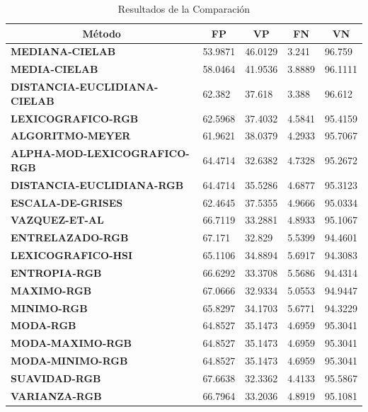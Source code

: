 \begin{table}[]
\centering
\caption{Resultados de la Comparación}
\label{resultados}
\resizebox{15cm}{!} {
\begin{tabular}{|l|l|l|l|l|}
\hline
\multicolumn{1}{|c|}{\textbf{Método}} & \multicolumn{1}{c|}{\textbf{FP}} & \multicolumn{1}{c|}{\textbf{VP}} & \multicolumn{1}{c|}{\textbf{FN}}	&	\multicolumn{1}{c|}{\textbf{VN}} \\ \hline
\textbf{MEDIANA-CIELAB} & 53.9871 & 46.0129 & 3.241 & 96.759\\ \hline
\textbf{MEDIA-CIELAB} & 58.0464 & 41.9536 & 3.8889 & 96.1111\\ \hline
\textbf{DISTANCIA-EUCLIDIANA-CIELAB} & 62.382 & 37.618 & 3.388 & 96.612\\ \hline
\textbf{LEXICOGRAFICO-RGB} & 62.5968 & 37.4032 & 4.5841 & 95.4159\\ \hline
\textbf{ALGORITMO-MEYER} & 61.9621 & 38.0379 & 4.2933 & 95.7067 \\ \hline
\textbf{ALPHA-MOD-LEXICOGRAFICO-RGB} & 64.4714 & 32.6382 & 4.7328 & 95.2672\\ \hline
\textbf{DISTANCIA-EUCLIDIANA-RGB} & 64.4714 & 35.5286 & 4.6877 & 95.3123 \\ \hline
\textbf{ESCALA-DE-GRISES} & 62.4645 & 37.5355 & 4.9666 & 95.0334 \\ \hline
\textbf{VAZQUEZ-ET-AL} & 66.7119 & 33.2881 & 4.8933 & 95.1067\\ \hline
\textbf{ENTRELAZADO-RGB} & 67.171 & 32.829 & 5.5399 & 94.4601 \\ \hline
\textbf{LEXICOGRAFICO-HSI} & 65.1106 & 34.8894 & 5.6917 & 94.3083 \\ \hline
\textbf{ENTROPIA-RGB} & 66.6292 & 33.3708 & 5.5686 & 94.4314 \\ \hline
\textbf{MAXIMO-RGB} & 67.0666 & 32.9334 & 5.0553 & 94.9447 \\ \hline
\textbf{MINIMO-RGB} & 65.8297 & 34.1703 & 5.6771 & 94.3229 \\ \hline
\textbf{MODA-RGB} & 64.8527 & 35.1473 & 4.6959 & 95.3041 \\ \hline
\textbf{MODA-MAXIMO-RGB} & 64.8527 & 35.1473 & 4.6959 & 95.3041 \\ \hline
\textbf{MODA-MINIMO-RGB} & 64.8527 & 35.1473 & 4.6959 & 95.3041 \\ \hline
\textbf{SUAVIDAD-RGB} & 67.6638 & 32.3362 & 4.4133 & 95.5867 \\ \hline
\textbf{VARIANZA-RGB} & 66.7964 & 33.2036 & 4.8919 & 95.1081 \\ \hline
\end{tabular}
}
\end{table}

